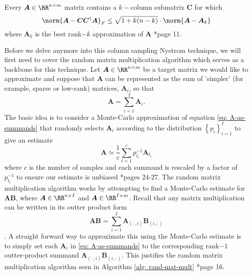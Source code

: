 \begin{thm} \label{lem: best-col-sel}
    Every $\bm{A} \in \RR^{n \times m}$ matrix contains a $k-$column submatrix $\bm{C}$ for which
    \[
        \norm{\bm{A} - \bm{C} \bm{C}^{\dagger} \bm{A}}_{F} \leq \sqrt{1 + k(n-k)} \cdot \norm{\bm{A} - \bm{A}_{k}}
    \]
    where $\bm{A}_k$ is the best rank$-k$ approximation of $\bm{A}$ \cite{halko2011finding}*{page 11}.
\end{thm}
Before we delve anymore into this column sampling Nystrom technique, we will first need to cover the random matrix multiplication algorithm which serves as a backbone for this technique. Let $\bm{A} \in \RR^{n \times m}$ be a target matrix we would like to approximate and suppose that $\bm{A}$ can be represented as the sum of 'simpler' (for example, sparse or low-rank) matrices, $\bm{A}_i$, so that
\begin{equation} \label{eq: A-as-summands}
    \bm{A} = \sum_{i=1}^{I} \bm{A}_i .
\end{equation}
The basic idea is to consider a Monte-Carlo approximation of equation \ref{eq: A-as-summands} that randomly selects $\bm{A}_i$ according to the distribution $\left\{ p_i \right\}_{i=1}^{I}$ to give an estimate
\begin{equation}
    \bm{A} \simeq \frac{1}{c} \sum_{t=1}^{c} p_{t_i}^{-1} \bm{A}_{t_i}
\end{equation}
where $c$ is the number of samples and each summand is rescaled by a factor of $p_{t_i}^{-1}$ to ensure our estimate is unbiased \cite{martinsson2021randomized}*{pages 24-27}. The random matrix multiplication algorithm works by attempting to find a Monte-Carlo estimate for $\bm{A}\bm{B}$, where $\bm{A} \in \RR^{n \times I}$ and $\bm{A} \in \RR^{I \times m}$. Recall that any matrix multiplication can be written in its outter product form
\begin{equation*}
    \bm{A} \bm{B} = \sum_{i=1}^{I} \bm{A}_{(:,i)} \bm{B}_{(i,:)}
\end{equation*}
\cite{Roosta2020, doi:10.1137/S0097539704442684}. A straight forward way to approximate this using the Monte-Carlo estimate is to simply set each $\bm{A}_i$ in \ref{eq: A-as-summands} to the corresponding rank$-1$ outter-product summand $\bm{A}_{(:,i)} \bm{B}_{(i,:)}$. This justifies the random matrix multiplication algorithm seen in Algorithm \ref{alg: rand-mat-mult} \cite{drineas2017lectures}*{page 16}.
